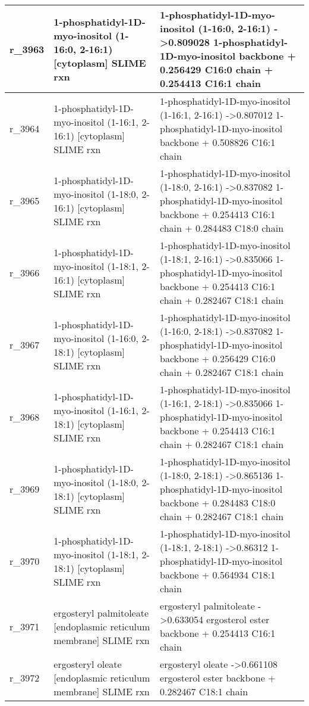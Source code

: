 \begin{landscape}
{\begin{longtable}{|l|p{7cm}|p{15cm}|}
r\_3963 & 1-phosphatidyl-1D-myo-inositol (1-16:0, 2-16:1) {[}cytoplasm{]} SLIME rxn & 1-phosphatidyl-1D-myo-inositol (1-16:0, 2-16:1)  -\textgreater 0.809028 1-phosphatidyl-1D-myo-inositol backbone + 0.256429 C16:0 chain + 0.254413 C16:1 chain \\ \hline
r\_3964 & 1-phosphatidyl-1D-myo-inositol (1-16:1, 2-16:1) {[}cytoplasm{]} SLIME rxn & 1-phosphatidyl-1D-myo-inositol (1-16:1, 2-16:1)  -\textgreater 0.807012 1-phosphatidyl-1D-myo-inositol backbone + 0.508826 C16:1 chain \\ \hline
r\_3965 & 1-phosphatidyl-1D-myo-inositol (1-18:0, 2-16:1) {[}cytoplasm{]} SLIME rxn & 1-phosphatidyl-1D-myo-inositol (1-18:0, 2-16:1)  -\textgreater 0.837082 1-phosphatidyl-1D-myo-inositol backbone + 0.254413 C16:1 chain + 0.284483 C18:0 chain \\ \hline
r\_3966 & 1-phosphatidyl-1D-myo-inositol (1-18:1, 2-16:1) {[}cytoplasm{]} SLIME rxn & 1-phosphatidyl-1D-myo-inositol (1-18:1, 2-16:1)  -\textgreater 0.835066 1-phosphatidyl-1D-myo-inositol backbone + 0.254413 C16:1 chain + 0.282467 C18:1 chain \\ \hline
r\_3967 & 1-phosphatidyl-1D-myo-inositol (1-16:0, 2-18:1) {[}cytoplasm{]} SLIME rxn & 1-phosphatidyl-1D-myo-inositol (1-16:0, 2-18:1)  -\textgreater 0.837082 1-phosphatidyl-1D-myo-inositol backbone + 0.256429 C16:0 chain + 0.282467 C18:1 chain \\ \hline
r\_3968 & 1-phosphatidyl-1D-myo-inositol (1-16:1, 2-18:1) {[}cytoplasm{]} SLIME rxn & 1-phosphatidyl-1D-myo-inositol (1-16:1, 2-18:1)  -\textgreater 0.835066 1-phosphatidyl-1D-myo-inositol backbone + 0.254413 C16:1 chain + 0.282467 C18:1 chain \\ \hline
r\_3969 & 1-phosphatidyl-1D-myo-inositol (1-18:0, 2-18:1) {[}cytoplasm{]} SLIME rxn & 1-phosphatidyl-1D-myo-inositol (1-18:0, 2-18:1)  -\textgreater 0.865136 1-phosphatidyl-1D-myo-inositol backbone + 0.284483 C18:0 chain + 0.282467 C18:1 chain \\ \hline
r\_3970 & 1-phosphatidyl-1D-myo-inositol (1-18:1, 2-18:1) {[}cytoplasm{]} SLIME rxn & 1-phosphatidyl-1D-myo-inositol (1-18:1, 2-18:1)  -\textgreater 0.86312 1-phosphatidyl-1D-myo-inositol backbone + 0.564934 C18:1 chain \\ \hline
r\_3971 & ergosteryl palmitoleate {[}endoplasmic reticulum membrane{]} SLIME rxn & ergosteryl palmitoleate  -\textgreater 0.633054 ergosterol ester backbone + 0.254413 C16:1 chain \\ \hline
r\_3972 & ergosteryl oleate {[}endoplasmic reticulum membrane{]} SLIME rxn & ergosteryl oleate  -\textgreater 0.661108 ergosterol ester backbone + 0.282467 C18:1 chain \\ \hline

\end{longtable}}
\end{landscape}
